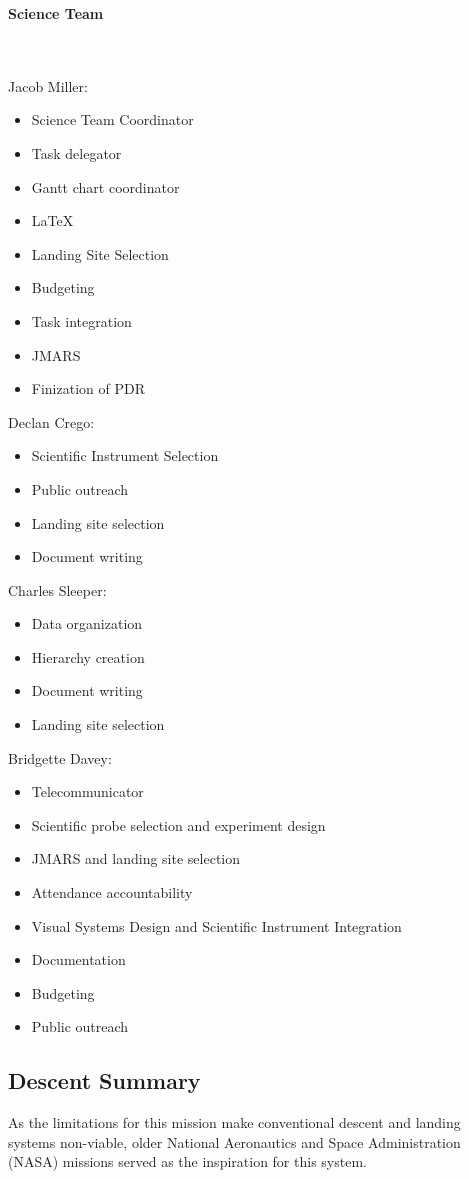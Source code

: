 \documentclass[%
 portrait,
 aapm,
 mph,%
 amsmath,amssymb,
 reprint,%
]{revtex4-2}
\begin{document}
\begin{Large}\textbf{Science Team}\end{Large}\\ \\
Jacob Miller:
\begin{itemize}
    \item Science Team Coordinator
    \item Task delegator
    \item Gantt chart coordinator
    \item \LaTeX
    \item Landing Site Selection
    \item Budgeting 
    \item Task integration
    \item JMARS
    \item Finization of PDR
\end{itemize}
Declan Crego:
\begin{itemize}
    \item Scientific Instrument Selection
    \item Public outreach
    \item Landing site selection
    \item Document writing
\end{itemize}
Charles Sleeper:
\begin{itemize}
    \item Data organization
    \item Hierarchy creation
    \item Document writing
    \item Landing site selection
\end{itemize}
Bridgette Davey:
\begin{itemize}
    \item Telecommunicator
    \item Scientific probe selection and experiment design
    \item JMARS and landing site selection
    \item Attendance accountability
    \item Visual Systems Design and Scientific Instrument Integration
    \item Documentation
    \item Budgeting
    \item Public outreach
\end{itemize}


\subsection{Descent Summary}
As the limitations for this mission make conventional descent and landing systems non-viable, older National Aeronautics and Space Administration (NASA) missions served as the inspiration for this system. 
\end{document}
